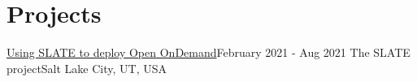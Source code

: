 \section{Projects}
\mySubHeadingListStart

  \mySubHeading
  {\href{https://slateci.io/blog/slate-open-ondemand.html}{\textcolor{linkcolor}{Using SLATE to deploy Open OnDemand}}}{February 2021 - Aug 2021}
  {The SLATE project}{Salt Lake City, UT, USA}
  \myItemListStart
  \myItemListEnd

\mySubHeadingListEnd

